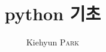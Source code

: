
%
%
%
%
%
%
%
%
%

\usepackage{cite}
\usepackage{textcomp}
\usepackage{tocloft}
\setlength{\cftbeforesecskip}{0pt}
\setlength{\cftbeforesubsecskip}{0pt}
\setlength{\cftbeforesubsubsecskip}{0pt}



\def\subject{관측 천문학} %
\title{python 기초} %
\author{Kiehyun \textsc{Park}} %
\def\email{guitar79@naver.com} %
\def\date{2018. 8. 18.} %
\def\school{Gyeonggi Science High School for the Gifted}





